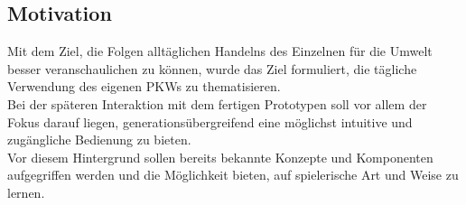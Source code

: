 \documentclass[.../Dokumentation.tex]{subfiles}
\begin{document}
\subsection{Motivation}\label{sec-intr-motivation}
Mit dem Ziel, die Folgen alltäglichen Handelns des Einzelnen für die Umwelt 
besser veranschaulichen zu können, wurde das Ziel formuliert, die tägliche 
Verwendung des eigenen PKWs zu thematisieren.\\
Bei der späteren Interaktion mit dem fertigen Prototypen soll vor 
allem der Fokus darauf liegen, generationsübergreifend eine möglichst intuitive 
und zugängliche Bedienung zu bieten.\\
Vor diesem Hintergrund sollen bereits bekannte Konzepte und Komponenten 
aufgegriffen werden und die Möglichkeit bieten, auf spielerische Art und 
Weise zu lernen.
\end{document}
